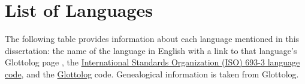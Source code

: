 \chapter*{List of Languages}
\label{ch:languages}

The following table provides information about each language mentioned in this dissertation: the name of the language in English  with a link to that language's Glottolog page \parencite{HammarstromForkelHaspelmath2019}, the \href{https://iso639-3.sil.org/}{International Standards Organization (ISO) 693-3 language code}, and the \href{https://glottolog.org/}{Glottolog} code. Genealogical information is taken from Glottolog.

\renewcommand{\arraystretch}{1}

